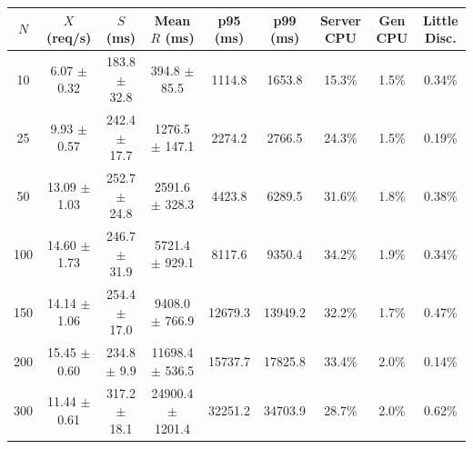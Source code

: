 \begin{tabular}{ccccccccc}
\toprule
\textbf{$N$} & \textbf{$X$ (req/s)} & \textbf{$S$ (ms)} & \textbf{Mean $R$ (ms)} & \textbf{p95 (ms)} & \textbf{p99 (ms)} & \textbf{Server CPU} & \textbf{Gen CPU} & \textbf{Little Disc.} \\
\midrule
10 & 6.07 $\pm$ 0.32 & 183.8 $\pm$ 32.8 & 394.8 $\pm$ 85.5 & 1114.8 & 1653.8 & 15.3\% & 1.5\% & 0.34\% \\
25 & 9.93 $\pm$ 0.57 & 242.4 $\pm$ 17.7 & 1276.5 $\pm$ 147.1 & 2274.2 & 2766.5 & 24.3\% & 1.5\% & 0.19\% \\
50 & 13.09 $\pm$ 1.03 & 252.7 $\pm$ 24.8 & 2591.6 $\pm$ 328.3 & 4423.8 & 6289.5 & 31.6\% & 1.8\% & 0.38\% \\
100 & 14.60 $\pm$ 1.73 & 246.7 $\pm$ 31.9 & 5721.4 $\pm$ 929.1 & 8117.6 & 9350.4 & 34.2\% & 1.9\% & 0.34\% \\
150 & 14.14 $\pm$ 1.06 & 254.4 $\pm$ 17.0 & 9408.0 $\pm$ 766.9 & 12679.3 & 13949.2 & 32.2\% & 1.7\% & 0.47\% \\
200 & 15.45 $\pm$ 0.60 & 234.8 $\pm$ 9.9 & 11698.4 $\pm$ 536.5 & 15737.7 & 17825.8 & 33.4\% & 2.0\% & 0.14\% \\
300 & 11.44 $\pm$ 0.61 & 317.2 $\pm$ 18.1 & 24900.4 $\pm$ 1201.4 & 32251.2 & 34703.9 & 28.7\% & 2.0\% & 0.62\% \\
\bottomrule
\end{tabular}
